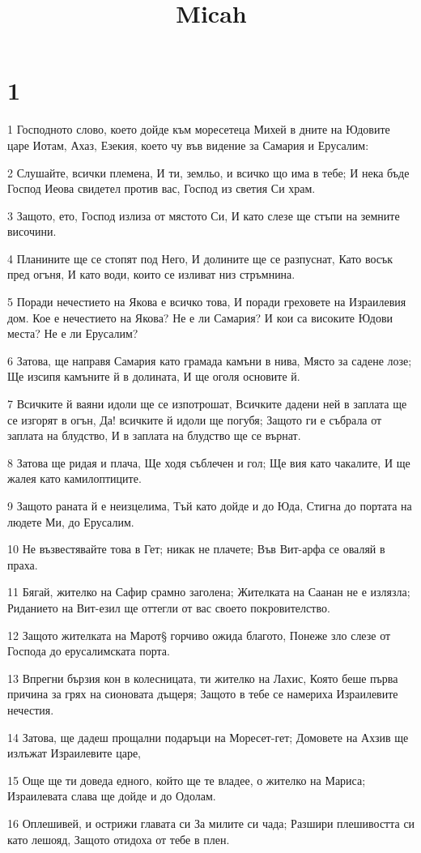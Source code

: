 

\title{Micah}


\chapter{1}

\par 1 Господното слово, което дойде към моресетеца Михей в дните на Юдовите царе Иотам, Ахаз, Езекия, което чу във видение за Самария и Ерусалим:
\par 2 Слушайте, всички племена, И ти, земльо, и всичко що има в тебе; И нека бъде Господ Иеова свидетел против вас, Господ из светия Си храм.
\par 3 Защото, ето, Господ излиза от мястото Си, И като слезе ще стъпи на земните височини.
\par 4 Планините ще се стопят под Него, И долините ще се разпуснат, Като восък пред огъня, И като води, които се изливат низ стръмнина.
\par 5 Поради нечестието на Якова е всичко това, И поради греховете на Израилевия дом. Кое е нечестието на Якова? Не е ли Самария? И кои са високите Юдови места? Не е ли Ерусалим?
\par 6 Затова, ще направя Самария като грамада камъни в нива, Място за садене лозе; Ще изсипя камъните й в долината, И ще оголя основите й.
\par 7 Всичките й ваяни идоли ще се изпотрошат, Всичките дадени ней в заплата ще се изгорят в огън, Да! всичките й идоли ще погубя; Защото ги е събрала от заплата на блудство, И в заплата на блудство ще се върнат.
\par 8 Затова ще ридая и плача, Ще ходя съблечен и гол; Ще вия като чакалите, И ще жалея като камилоптиците.
\par 9 Защото раната й е неизцелима, Тъй като дойде и до Юда, Стигна до портата на людете Ми, до Ерусалим.
\par 10 Не възвестявайте това в Гет; никак не плачете; Във Вит-арфа се оваляй в праха.
\par 11 Бягай, жителко на Сафир срамно заголена; Жителката на Саанан не е излязла; Риданието на Вит-езил ще оттегли от вас своето покровителство.
\par 12 Защото жителката на Марот§ горчиво ожида благото, Понеже зло слезе от Господа до ерусалимската порта.
\par 13 Впрегни бързия кон в колесницата, ти жителко на Лахис, Която беше първа причина за грях на сионовата дъщеря; Защото в тебе се намериха Израилевите нечестия.
\par 14 Затова, ще дадеш прощални подаръци на Моресет-гет; Домовете на Ахзив ще излъжат Израилевите царе,
\par 15 Още ще ти доведа едного, който ще те владее, о жителко на Мариса; Израилевата слава ще дойде и до Одолам.
\par 16 Оплешивей, и острижи главата си За милите си чада; Разшири плешивостта си като лешояд, Защото отидоха от тебе в плен.

